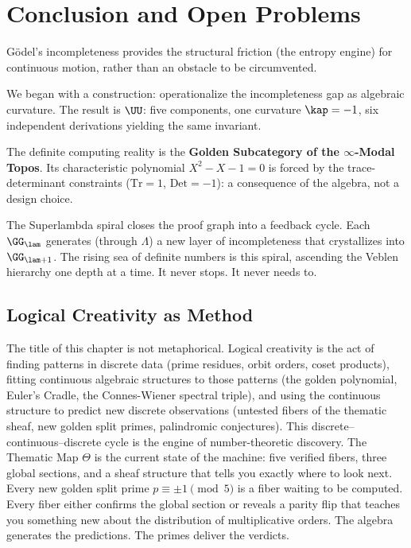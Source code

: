 \section*{Conclusion and Open Problems}

G\"odel's incompleteness provides the structural friction (the entropy engine) for continuous motion, rather than an obstacle to be circumvented.

We began with a construction: operationalize the incompleteness gap as algebraic curvature. The result is $\UU$: five components, one curvature $\kap = -1$, six independent derivations yielding the same invariant.

The definite computing reality is the \textbf{Golden Subcategory of the $\infty$-Modal Topos}. Its characteristic polynomial $X^2 - X - 1 = 0$ is forced by the trace-determinant constraints ($\mathrm{Tr} = 1$, $\mathrm{Det} = -1$): a consequence of the algebra, not a design choice.

The Superlambda spiral closes the proof graph into a feedback cycle. Each $\GG_\lam$ generates (through $\Lambda$) a new layer of incompleteness that crystallizes into $\GG_{\lam+1}$. The rising sea of definite numbers is this spiral, ascending the Veblen hierarchy one depth at a time. It never stops. It never needs to.

\subsection*{Logical Creativity as Method}

The title of this chapter is not metaphorical. Logical creativity is the act of finding patterns in discrete data (prime residues, orbit orders, coset products), fitting continuous algebraic structures to those patterns (the golden polynomial, Euler's Cradle, the Connes-Wiener spectral triple), and using the continuous structure to predict new discrete observations (untested fibers of the thematic sheaf, new golden split primes, palindromic conjectures). This discrete--continuous--discrete cycle is the engine of number-theoretic discovery. The Thematic Map $\Theta$ is the current state of the machine: five verified fibers, three global sections, and a sheaf structure that tells you exactly where to look next. Every new golden split prime $p \equiv \pm 1 \pmod{5}$ is a fiber waiting to be computed. Every fiber either confirms the global section or reveals a parity flip that teaches you something new about the distribution of multiplicative orders. The algebra generates the predictions. The primes deliver the verdicts.

